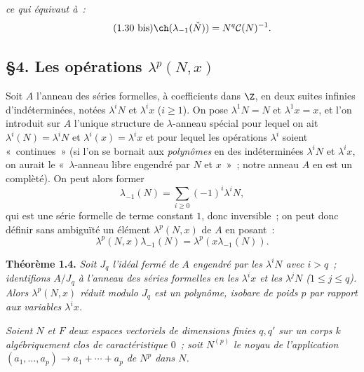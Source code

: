 \emph{ce qui équivaut à~:}
\begin{equation}\tag{1.30 bis}
\ch(\lambda_{-1}(\check N))=N^q\mathcal C(N)^{-1}.
\end{equation}

\subsection*{\S 4. Les opérations $\lambda^p(N,x)$}

Soit $A$ l'anneau des séries formelles, à coefficients dans $\Z$, en deux suites infinies d'indéterminées, notées $\lambda^iN$ et $\lambda^i x$ ($i\geq1$). On pose $\lambda^1N=N$ et $\lambda^1x=x$, et l'on introduit sur $A$ l'unique structure de $\lambda$-anneau spécial pour lequel on ait $\lambda^i(N)=\lambda^iN$ et $\lambda^i(x)=\lambda^ix$ et pour lequel les opérations $\lambda^i$ soient «~continues~» (si l'on se bornait aux \emph{polynômes} en des indéterminées $\lambda^iN$ et $\lambda^ix$, on aurait le «~$\lambda$-anneau libre engendré par $N$ et $x$~»~; notre anneau $A$ en est un complèté). On peut alors former
\begin{equation}\tag{1.31}
\lambda_{-1}(N)=\sum_{i\geq0}(-1)^i\lambda^iN,
\end{equation}
qui est une série formelle de terme constant $1$, donc inversible~; on peut donc définir sans ambiguïté un élément $\lambda^p(N,x)$ de $A$ en posant~:
\begin{equation}\tag{1.32}
\lambda^p(N,x)\lambda_{-1}(N)=\lambda^p(x\lambda_{-1}(N)).
\end{equation}

\textbf{Théorème 1.4.} \emph{Soit $J_q$ l'idéal fermé de $A$ engendré par les $\lambda^iN$ avec $i>q$~; identifions $A/J_q$ à l'anneau des séries formelles en les $\lambda^i x$ et les $\lambda^jN$ ($1\leq j\leq q$). Alors $\lambda^p(N,x)$ réduit modulo $J_q$ est un polynôme, isobare de poids $p$ par rapport aux variables $\lambda^i x$.}

\emph{Soient $N$ et $F$ deux espaces vectoriels de dimensions finies $q,q'$ sur un corps $k$ algébriquement clos de caractéristique $0$~; soit $N^{(p)}$ le noyau de l'application} $(a_1,\ldots,a_p)\longrightarrow a_1+\cdots+a_p$ \emph{de $N^p$ dans $N$.}
